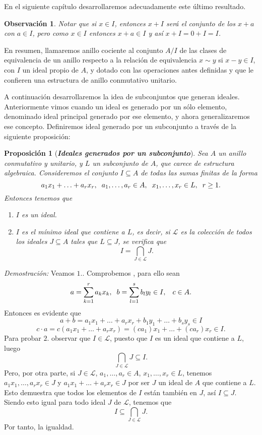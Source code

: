 \documentclass[12pt]{article}
\newtheorem{proposition}[theorem]{Proposición}
\newtheorem{observation}{Observación}[theorem]
\begin{document}
En el siguiente capítulo desarrollaremos adecuadamente este último resultado.

\begin{observation} Notar que si $x \in I$, entonces $x + I$ será el conjunto de los $x+a$ con $a \in I$, pero como $x \in I$ entonces $x+a \in I$ y así $x + I = 0 + I = I$.
\end{observation}

En resumen, llamaremos anillo cociente al conjunto $A/I$ de las clases de equivalencia de un anillo respecto a la relación de equivalencia $x \sim y$ si $x-y \in I$, con $I$ un ideal propio de $A$, y dotado con las operaciones antes definidas y que le confieren una estructura de anillo conmutativo unitario.

A continuación desarrollaremos la idea de subconjuntos que generan ideales. Anteriormente vimos cuando un ideal es generado por un sólo elemento, denominado ideal principal generado por ese elemento, y ahora generalizaremos ese concepto. Definiremos ideal generado por un subconjunto a través de la siguiente proposición:

\begin{proposition}[\textbf{\textit{Ideales generados por un subconjunto}}]
Sea $A$ un anillo conmutativo y unitario, y $L$ un subconjunto de $A$, que carece de estructura algebraica. Consideremos el conjunto $I \subseteq A$ de todas las sumas finitas de la forma $$a_{1}x_{1} + \ldots + a_{r}x_{r}, \hspace{0.2cm} a_{1}, \ldots, a_{r} \in A, \hspace{0.2cm} x_{1}, \ldots, x_{r} \in L, \hspace{0.2cm} r \geq 1.$$ Entonces tenemos que \begin{enumerate}
\item $I$ es un ideal.
\item $I$ es el mínimo ideal que contiene a $L$, es decir, si $\mathcal{L}$ es la colección de todos los ideales $J \subseteq A$ tales que $ L \subseteq J$, se verifica que $$I = \bigcap_{J \in \mathcal{L}} J.$$
\end{enumerate}
\end{proposition}
\emph{Demostración: } Veamos $1.$. Comprobemos , para ello sean $$a = \sum_{k =1}^{r}a_{k}x_{k}, \hspace{0.2cm} b= \sum_{l=1}^{s} b_{l}y_{l} \in I, \hspace{0.3cm} c \in A.$$ Entonces es evidente que $$a+b = a_{1}x_{1} + \ldots + a_{r}x_{r} + b_{1}y_{1} + \ldots + b_{s}y_{s} \in I$$ $$c \cdot a = c(a_{1}x_{1} + \ldots + a_{r}x_{r}) =(ca_{1})x_{1} + \ldots + (ca_{r})x_{r} \in I.$$ Para probar $2.$ observar que $I \in \mathcal{L}$, puesto que $I$ es un ideal que contiene a $L$, luego $$\bigcap_{J \in \mathcal{L}} J \subseteq I.$$ Pero, por otra parte, si $J \in \mathcal{L}$, $a_{1}, \ldots, a_{r} \in A$, $x_{1}, \ldots, x_{r} \in L$, tenemos $a_{1}x_{1}, \ldots, a_{r}x_{r} \in J$ y $a_{1}x_{1}+ \ldots + a_{r}x_{r} \in J$ por ser $J$ un ideal de $A$ que contiene a $L$. Esto demuestra que todos los elementos de $I$ están también en $J$, así $I \subseteq J$. Siendo esto igual para todo ideal $J$ de $\mathcal{L}$, tenemos que $$I \subseteq \bigcap_{J \in \mathcal{L}} J.$$ Por tanto, la igualdad.
\end{document}
